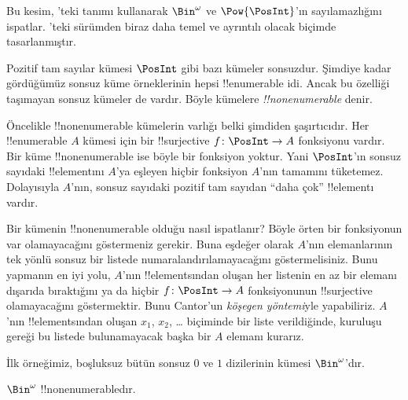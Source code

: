 



\begin{editorial}
  Bu kesim, 'teki tanımı kullanarak $\Bin^\omega$ ve
  $\Pow{\PosInt}$'ın sayılamazlığını ispatlar. 'teki
  sürümden biraz daha temel ve ayrıntılı olacak biçimde tasarlanmıştır.
\end{editorial}

Pozitif tam sayılar kümesi $\PosInt$ gibi bazı kümeler sonsuzdur. Şimdiye
kadar gördüğümüz sonsuz küme örneklerinin hepsi !!{enumerable} idi. Ancak bu
özelliği taşımayan sonsuz kümeler de vardır. Böyle kümelere
\emph{!!{nonenumerable}} denir.

Öncelikle !!{nonenumerable} kümelerin varlığı belki şimdiden şaşırtıcıdır.
Her !!{enumerable} $A$ kümesi için bir !!{surjective} $f\colon\PosInt\to A$
fonksiyonu vardır. Bir küme !!{nonenumerable} ise böyle bir fonksiyon yoktur.
Yani $\PosInt$'ın sonsuz sayıdaki !!{element}{}ını $A$'ya eşleyen hiçbir
fonksiyon $A$'nın tamamını tüketemez. Dolayısıyla $A$'nın, sonsuz sayıdaki
pozitif tam sayıdan ``daha çok'' !!{element}{}ı vardır.

Bir kümenin !!{nonenumerable} olduğu nasıl ispatlanır? Böyle örten bir
fonksiyonun var olamayacağını göstermeniz gerekir. Buna eşdeğer olarak
$A$'nın elemanlarının tek yönlü sonsuz bir listede numaralandırılamayacağını
göstermelisiniz. Bunu yapmanın en iyi yolu, $A$'nın !!{element}s{}ından oluşan
her listenin en az bir elemanı dışarıda bıraktığını ya da hiçbir
$f\colon\PosInt\to A$ fonksiyonunun !!{surjective} olamayacağını
göstermektir. Bunu Cantor'un \emph{köşegen yöntemi}yle yapabiliriz. $A$'nın
!!{element}s{}ından oluşan $x_1$, $x_2$, \dots{} biçiminde bir liste verildiğinde,
kuruluşu gereği bu listede bulunamayacak başka bir $A$ elemanı kurarız.

İlk örneğimiz, boşluksuz bütün sonsuz $0$ ve $1$ dizilerinin kümesi
$\Bin^\omega$'dır.

\begin{thm}
$\Bin^\omega$ !!{nonenumerable}{}dır.
\end{thm}

